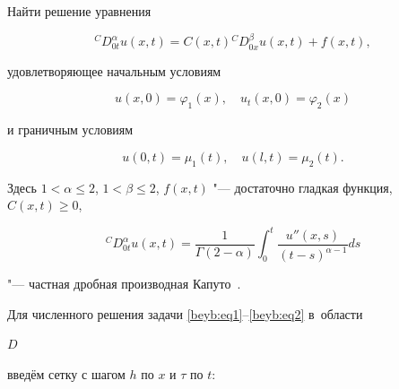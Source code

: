 \begin{task}Найти решение уравнения

\begin{equation}

\label{beyb:eq1}

{}^C\! D_{0t}^\alpha u(x,t)=C(x,t){}^C\!D_{0x}^\beta u(x,t)+f(x,t),

\end{equation}

удовлетворяющее начальным условиям

\begin{equation}

\label{beyb:eq2}

u(x, 0)=\varphi _1 (x), \quad u_t (x, 0)=\varphi _2 (x)

\end{equation}

и граничным условиям

\begin{equation}

\label{beyb:eq2}

u(0, t)=\mu _1 (t), \quad u(l, t)=\mu _2 (t).

\end{equation}

\end{task}



\noindent

Здесь $1<\alpha \le 2$, $1<\beta \le 2$, $f(x,t)$ "--- достаточно гладкая функция,  \mbox{$C(x,t)\ge 0$,}

$$

^C\! D_{0t}^\alpha u(x,t)=\frac{1}{\Gamma (2-\alpha )}\int_0^t

\frac{u''(x,s)}{(t-s)^{\alpha -1}}ds

$$

"--- частная дробная производная Капуто~\cite{beyb:bib3}.






\smallskip




Для численного решения задачи \eqref{beyb:eq1}--\eqref{beyb:eq2} в~области

$D$

введём сетку с шагом $h$ по $x$ и $\tau$ по $t$:

